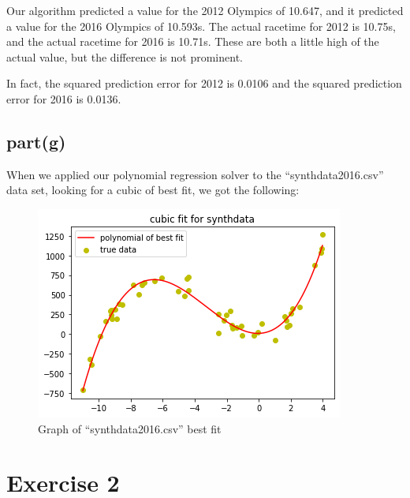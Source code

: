 \documentclass[12pt]{amsart}
\begin{document}
Our algorithm predicted a value for the 2012 Olympics of 10.647, and it predicted a value for the 2016 Olympics of 10.593s. The actual racetime for 2012 is 10.75s, and the actual racetime for 2016 is 10.71s. These are both a little high of the actual value, but the difference is not prominent.

In fact, the squared prediction error for 2012 is 0.0106 and the squared prediction error for 2016 is 0.0136.

\subsection*{part(g)}

When we applied our polynomial regression solver to the ``synthdata2016.csv'' data set, looking for a cubic of best fit, we got the following:

\begin{figure}[H]
    \centering
    \includegraphics{Figure_synthdata.png}
    \caption{Graph of ``synthdata2016.csv'' best fit}
    \label{fig:my_label}
\end{figure}

\newpage
\section*{Exercise 2}
\end{document}
